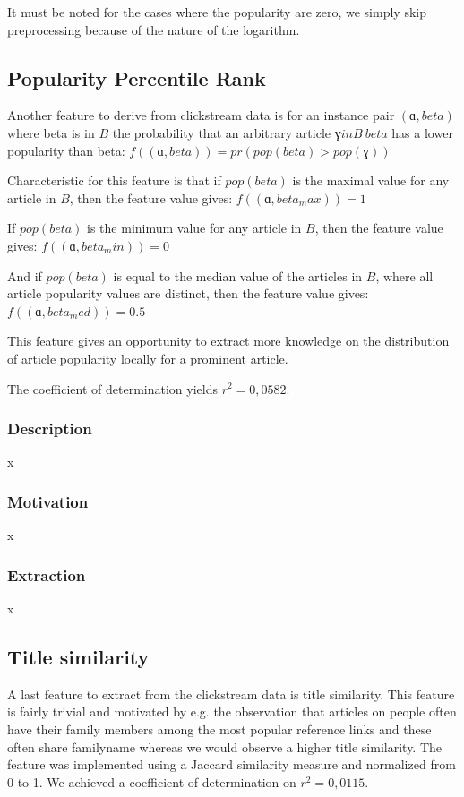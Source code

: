 It must be noted for the cases where the popularity are zero, we simply skip preprocessing because of the nature of the logarithm.





\subsection{Popularity Percentile Rank}


Another feature to derive from clickstream data is for an instance pair $( ɑ , beta)$ where beta is in $B$ the probability that an arbitrary article $ɣ in B \ { beta }$ has a lower popularity than beta:
$f( ( ɑ , beta) ) = pr( pop(beta) > pop(ɣ) )$

Characteristic for this feature is that if $pop(beta)$ is the maximal value for any article in $B$, then the feature value gives:
$f( ( ɑ , beta_max) ) = 1$

If $pop(beta)$ is the minimum value for any article in $B$, then the feature value gives:
$f( ( ɑ , beta_min) ) = 0$

And if $pop(beta)$ is equal to the median value of the articles in $B$, where all article popularity values are distinct, then the feature value gives:
$f( ( ɑ , beta_med) ) = 0.5$

This feature gives an opportunity to extract more knowledge on the distribution of article popularity locally for a prominent article.

The coefficient of determination yields $r^2 = 0,0582$.

\subsubsection{Description}
x
\subsubsection{Motivation}
x
\subsubsection{Extraction}
x




\subsection{Title similarity}
A last feature to extract from the clickstream data is title similarity. This feature is fairly trivial and motivated by e.g. the observation that articles on people often have their family members among the most popular reference links and these often share familyname whereas we would observe a higher title similarity. The feature was implemented using a Jaccard similarity measure and normalized from 0 to 1. We achieved a coefficient of determination on $r^2 = 0,0115$.


 \\